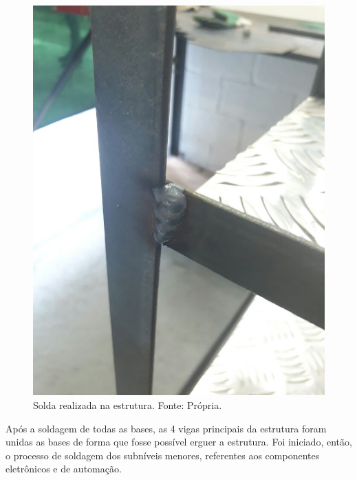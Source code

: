   \begin{figure}[H]
    \centering
    \includegraphics[scale= 0.2]{figuras/estrutura/solda-realizada.jpg}
    \caption{Solda realizada na estrutura. Fonte: Própria.}
    \label{modelagem}
  \end{figure}

  Após a soldagem de todas as bases, as 4 vigas principais da estrutura foram unidas as 
  bases de forma que fosse possível erguer a estrutura. Foi iniciado, então, o processo 
  de soldagem dos subníveis menores, referentes aos componentes eletrônicos e de automação.

